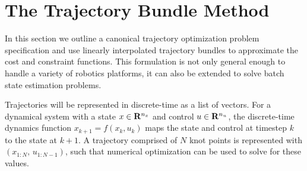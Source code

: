 \section{The Trajectory Bundle Method}
In this section we outline a canonical trajectory optimization problem specification and use linearly interpolated trajectory bundles to approximate the cost and constraint functions. This formulation is not only general enough to handle a variety of robotics platforms, it can also be extended to solve batch state estimation problems.

Trajectories will be represented in discrete-time as a list of vectors. For a dynamical system with a state $x \in \mathbf{R}^{n_x}$ and control $u\in\mathbf{R}^{n_u}$, the discrete-time dynamics function $x_{k+1} = f(x_k, u_k)$ maps the state and control at timestep $k$ to the state at $k+1$. A trajectory comprised of $N$ knot points is represented with $(x_{1:N}, \, u_{1:N-1})$, such that numerical optimization can be used to solve for these values. 

